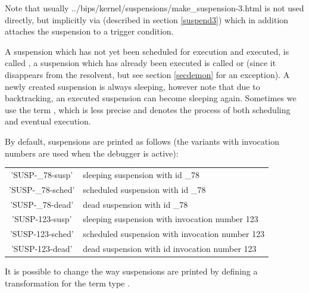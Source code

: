 Note that usually
%
{../bips/kernel/suspensions/make_suspension-3.html}
is not used directly, but implicitly via
%
(described in section \ref{suspend3}) which in addition attaches the suspension
to a
trigger condition.

A suspension which has not yet been scheduled
for execution and executed, is called
,
a suspension which has already been executed is called
or
(since it disappears from the resolvent,
but see section \ref{secdemon} for an exception).
A newly created suspension is always sleeping, however
note that due to backtracking, an executed suspension
can become sleeping again.
Sometimes we use the term
,
which is less precise and
denotes the process of both scheduling and eventual execution.


By default, suspensions are printed as follows (the variants with invocation
numbers are used when the debugger is active):
\begin{center}
\begin{tabular}{|c|l|}
\hline
'SUSP-_78-susp'		&   sleeping suspension with id _78 \\
'SUSP-_78-sched'	&   scheduled suspension with id _78 \\
'SUSP-_78-dead'		&   dead suspension with id _78 \\
\hline
'SUSP-123-susp'		&   sleeping suspension with invocation number 123 \\
'SUSP-123-sched'	&   scheduled suspension with invocation number 123 \\
'SUSP-123-dead'		&   dead suspension with id invocation number 123 \\
\hline
\end{tabular}
\end{center}
It is possible to change the way suspensions are printed by defining a
transformation for the term type .



